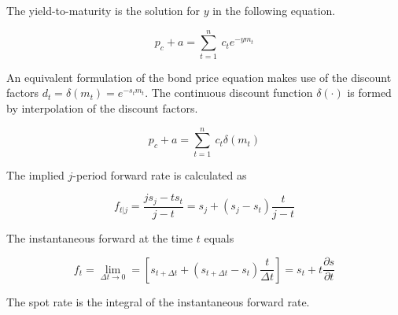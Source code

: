 The yield-to-maturity is the solution for $y$ in the following equation.

\begin{equation}
  \label{yield}
  p_c+a=\sum_{t=1}^n \ c_t e^{-ym_t}
\end{equation}

An equivalent formulation of the bond price equation makes use of the discount factors $d_t=\delta(m_t)=e^{-s_tm_t}$. The continuous discount function $\delta(\cdot)$ is formed by interpolation of the discount factors.

\begin{equation}
  \label{bondprceq2}
  p_c+a=\sum_{t=1}^n \ c_t \delta(m_t) \end{equation}


The implied $j$-period forward rate is calculated as

\begin{equation}
  \label{forwrate}
  f_{t|j}=\frac{js_j-ts_t}{j-t}=s_j+(s_j-s_t)\frac{t}{j-t}
\end{equation}

The instantaneous forward at the time $t$ equals

\begin{equation}
  \label{instfwdrate}
  f_t=\lim_{\Delta t \rightarrow 0}=\left[s_{t+\Delta t}+(s_{t+\Delta t}-s_t)\frac{t}{\Delta t}\right]=s_t+t\frac{\partial s}{\partial t}
\end{equation}

The spot rate is the integral of the instantaneous forward rate.





